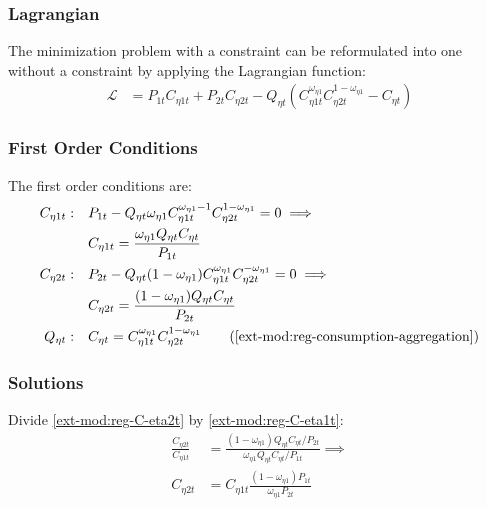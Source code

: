 \documentclass[../thesis.tex]{subfiles}
\begin{document}
\subsubsection*{Lagrangian}


The minimization problem with a constraint can be reformulated into one without a constraint by applying the Lagrangian function:
	\begin{align}
		\mathcal{L} &= P_{1 t} C_{\eta 1t} + P_{2 t} C_{\eta 2t} - Q_{\eta t} (C_{\eta 1 t}^{\omega_{\eta 1}} C_{\eta 2 t}^{1-\omega_{\eta 1}} - C_{\eta t}) \label{ext-mod:reg-consumption-lagrangian}
	\end{align}

\subsubsection*{First Order Conditions}

	The first order conditions are:
	\begin{align}
		C_{\eta 1 t}: &\quad P_{1 t} - Q_{\eta t} \omega_{\eta 1} C_{\eta 1 t}^{\omega_{\eta 1} - 1} C_{\eta 2 t}^{1-\omega_{\eta 1}} = 0 \implies \nonumber \\
		&\quad C_{\eta 1 t} = \frac{\omega_{\eta 1} Q_{\eta t} C_{\eta t}}{P_{1t}} \label{ext-mod:reg-C-eta1t}
		\\
		C_{\eta 2 t}: &\quad P_{2 t} - Q_{\eta t} (1 - \omega_{\eta 1}) C_{\eta 1 t}^{\omega_{\eta 1}} C_{\eta 2 t}^{-\omega_{\eta 1}} = 0 \implies \nonumber \\
		&\quad C_{\eta 2 t} = \frac{(1 - \omega_{\eta 1}) Q_{\eta t} C_{\eta t}}{P_{2t}} \label{ext-mod:reg-C-eta2t}
		\\
		Q_{\eta t}: &\quad C_{\eta t} = C_{\eta 1 t}^{\omega_{\eta 1}} C_{\eta 2 t}^{1-\omega_{\eta 1}} \tag{\ref{ext-mod:reg-consumption-aggregation}}
	\end{align}

\subsubsection*{Solutions}

	Divide \ref{ext-mod:reg-C-eta2t} by \ref{ext-mod:reg-C-eta1t}:
	\begin{align}
		\frac{C_{\eta 2 t}}{C_{\eta 1 t}} &= \frac{(1 - \omega_{\eta 1}) Q_{\eta t} C_{\eta t} / P_{2t}}{\omega_{\eta 1} Q_{\eta t} C_{\eta t} / P_{1t}} \implies \nonumber \\
		C_{\eta 2 t} &= C_{\eta 1 t} \frac{(1 - \omega_{\eta 1}) P_{1t}}{\omega_{\eta 1} P_{2t}} \label{ext-mod:reg-C-eta-12-t}
	\end{align}
	
\end{document}
